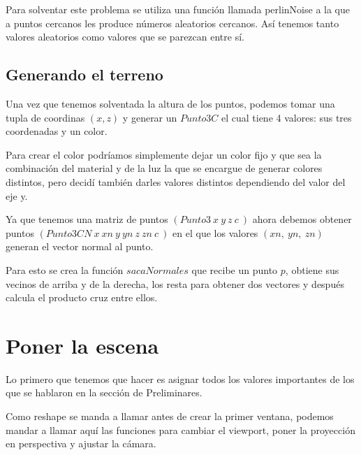\documentclass{article}
\begin{document}
Para solventar este problema se utiliza una función llamada perlinNoise a la que a puntos cercanos les produce números aleatorios cercanos. Así tenemos tanto valores aleatorios como valores que se parezcan entre sí.

\subsection{Generando el terreno}

Una vez que tenemos solventada la altura de los puntos, podemos tomar una tupla de coordinas $(x, z)$ y generar un $Punto3C$ el cual tiene 4 valores: sus tres coordenadas y un color.

Para crear el color podríamos simplemente dejar un color fijo y que sea la combinación del material y de la luz la que se encargue de generar colores distintos, pero decidí también darles valores distintos dependiendo del valor del eje y.

Ya que tenemos una matriz de puntos $(Punto3\ x\ y\ z\ c\ )$ ahora debemos obtener puntos $(Punto3CN\ x\ xn\ y\ yn\ z\ zn\ c\ )$ en el que los valores $(xn,\ yn,\ zn)$ generan el vector normal al punto.

Para esto se crea la función $sacaNormales$ que recibe un punto $p$, obtiene sus vecinos de arriba y de la derecha, los resta para obtener dos vectores y después calcula el producto cruz entre ellos.
\begin{figure}[h!]%
    \centering
    \qquad
    
\end{figure}


\section{Poner la escena}
Lo primero que tenemos que hacer es asignar todos los valores importantes de los que se hablaron en la sección de Preliminares. 

Como reshape se manda a llamar antes de crear la primer ventana, podemos mandar a llamar aquí las funciones para cambiar el viewport, poner la proyección en perspectiva y ajustar la cámara.
\end{document}
